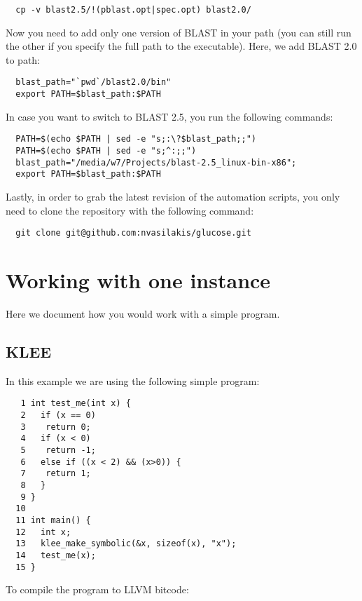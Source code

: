 \documentclass[a4paper, 11pt,twoside]{article}
\begin{document}
\begin{verbatim} 
  cp -v blast2.5/!(pblast.opt|spec.opt) blast2.0/
\end{verbatim}

Now you need to add only one version of BLAST in your path (you can still run the other if you specify the full path to the executable). Here, we add BLAST 2.0 to path:

\begin{verbatim} 
  blast_path="`pwd`/blast2.0/bin"
  export PATH=$blast_path:$PATH
\end{verbatim}

In case you want to switch to BLAST 2.5, you run the following commands:

\begin{verbatim} 
  PATH=$(echo $PATH | sed -e "s;:\?$blast_path;;")
  PATH=$(echo $PATH | sed -e "s;^:;;")
  blast_path="/media/w7/Projects/blast-2.5_linux-bin-x86";
  export PATH=$blast_path:$PATH
\end{verbatim}

Lastly, in order to grab the latest revision of the automation scripts, you only need to clone the repository with the following command:

\begin{verbatim} 
  git clone git@github.com:nvasilakis/glucose.git
\end{verbatim}

\section{Working with one instance}

Here we document how you would work with a simple program.

\subsection{KLEE}

In this example we are using the following simple program:

\begin{verbatim} 
   1 int test_me(int x) {
   2   if (x == 0)
   3 	return 0;
   4   if (x < 0)
   5 	return -1;
   6   else if ((x < 2) && (x>0)) {
   7 	return 1;
   8   }
   9 }
  10
  11 int main() {
  12   int x;
  13   klee_make_symbolic(&x, sizeof(x), "x");
  14   test_me(x);
  15 }
\end{verbatim}

To compile the program to LLVM bitcode:
\end{document}
